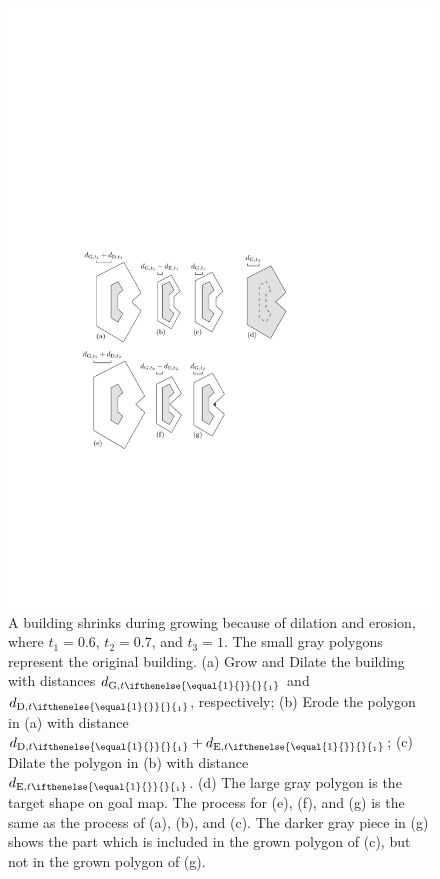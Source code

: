 \documentclass[graybox]{svmult}
\newcommand{\dtrm}[2][]{d_{\mathrm{#2}, t\ifthenelse{\equal{#1}{}}{}{_#1}}}
\begin{document}
\begin{figure}[tb]
	\centering
	\includegraphics[]{Shrink_Erosion}
	\caption{A building shrinks during growing because of dilation and erosion, 
	where $t_1=0.6$, $t_2=0.7$, and $t_3=1$.
		The small gray polygons represent the original building.
		(a) Grow and Dilate the building with distances $\dtrm[1]{G}$ and 
		$\dtrm[1]{D}$, respectively;
		(b) Erode the polygon in (a) with distance $\dtrm[1]{D} + \dtrm[1]{E}$;
		(c) Dilate the polygon in (b) with distance $\dtrm[1]{E}$.
		(d) The large gray polygon is the target shape on goal map.
		The process for (e), (f), and (g) is the same as the process of (a), 
		(b), and (c).
		The darker gray piece in (g) shows 
		the part which is included in the grown polygon of (c), 
		but not in the grown polygon of (g).
	}
	\label{fig:Shrink_Erosion}
\end{figure}
\end{document}
